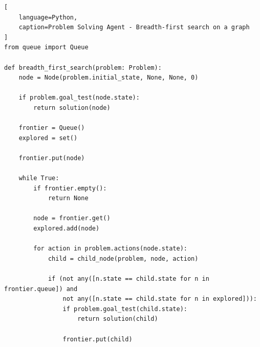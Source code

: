 \begin{lstlisting}[
    language=Python,
    caption=Problem Solving Agent - Breadth-first search on a graph
]
from queue import Queue

def breadth_first_search(problem: Problem):
    node = Node(problem.initial_state, None, None, 0)

    if problem.goal_test(node.state):
        return solution(node)

    frontier = Queue()
    explored = set()

    frontier.put(node)

    while True:
        if frontier.empty():
            return None

        node = frontier.get()
        explored.add(node)

        for action in problem.actions(node.state):
            child = child_node(problem, node, action)

            if (not any([n.state == child.state for n in frontier.queue]) and
                not any([n.state == child.state for n in explored])):
                if problem.goal_test(child.state):
                    return solution(child)

                frontier.put(child)
\end{lstlisting}











